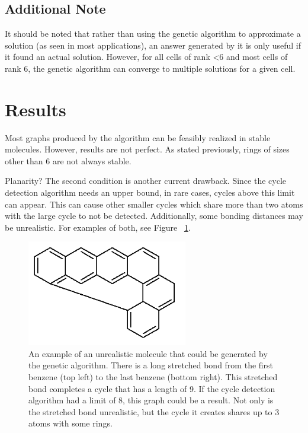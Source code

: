 \documentclass[12pt]{article}
\begin{document}
\subsection{Additional Note}

It should be noted that rather than using the genetic algorithm to approximate a solution (as seen in most applications), an answer generated by it is only useful if it found an actual solution. However, for all cells of rank \textless 6 and most cells of rank 6, the genetic algorithm can converge to multiple solutions for a given cell. 

\section{Results}

Most graphs produced by the algorithm can be feasibly realized in stable molecules. However, results are not perfect. As stated previously, rings of sizes other than 6 are not always stable. 

Planarity? The second condition is another current drawback. Since the cycle detection algorithm needs an upper bound, in rare cases, cycles above this limit can appear. This can cause other smaller cycles which share more than two atoms with the large cycle to not be detected. Additionally, some bonding distances may be unrealistic. For examples of both, see Figure ~\ref{fig:unrealistic}.

\begin{figure}[ht!]
\centering
\includegraphics[width=70mm]{unrealistic.png}
\caption{An example of an unrealistic molecule that could be generated by the genetic algorithm. There is a long stretched bond from the first benzene (top left) to the last benzene (bottom right). This stretched bond completes a cycle that has a length of 9. If the cycle detection algorithm had a limit of 8, this graph could be a result. Not only is the stretched bond unrealistic, but the cycle it creates shares up to 3 atoms with some rings.}
\label{fig:unrealistic}
\end{figure}
 
\end{document}
